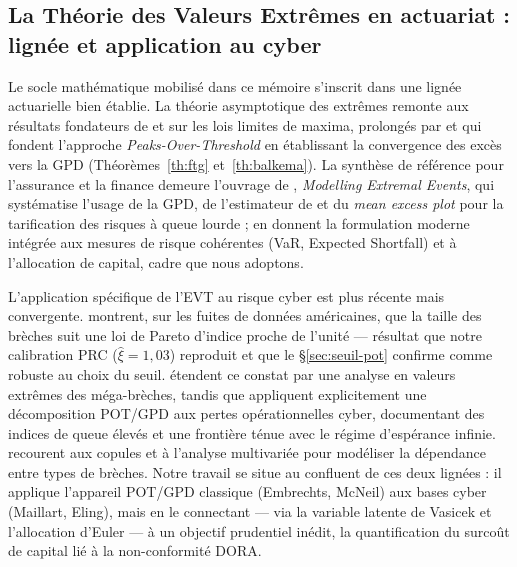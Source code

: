 \documentclass[11pt,a4paper]{article}
\theoremstyle{navystyle}
\theoremstyle{navydef}
\begin{document}
\subsection{La Théorie des Valeurs Extrêmes en actuariat : lignée et application au cyber}

Le socle mathématique mobilisé dans ce mémoire s'inscrit dans une lignée actuarielle bien établie. La théorie asymptotique des extrêmes remonte aux résultats fondateurs de \citet{fishertippett1928} et \citet{gnedenko1943} sur les lois limites de maxima, prolongés par \citet{pickands1975} et \citet{balkemadehaan1974} qui fondent l'approche \emph{Peaks-Over-Threshold} en établissant la convergence des excès vers la GPD (Théorèmes~\ref{th:ftg} et~\ref{th:balkema}). La synthèse de référence pour l'assurance et la finance demeure l'ouvrage de \citet{Embrechts1997}, \emph{Modelling Extremal Events}, qui systématise l'usage de la GPD, de l'estimateur de \citet{Hill1975} et du \emph{mean excess plot} pour la tarification des risques à queue lourde ; \citet{mcneil2015} en donnent la formulation moderne intégrée aux mesures de risque cohérentes (VaR, Expected Shortfall) et à l'allocation de capital, cadre que nous adoptons.

L'application spécifique de l'EVT au risque cyber est plus récente mais convergente. \citet{MaillartSornette2010} montrent, sur les fuites de données américaines, que la taille des brèches suit une loi de Pareto d'indice proche de l'unité --- résultat que notre calibration PRC ($\hat\xi=1{,}03$) reproduit et que le §\ref{sec:seuil-pot} confirme comme robuste au choix du seuil. \citet{wheatley2016} étendent ce constat par une analyse en valeurs extrêmes des méga-brèches, tandis que \citet{elingwirfs2019} appliquent explicitement une décomposition POT/GPD aux pertes opérationnelles cyber, documentant des indices de queue élevés et une frontière ténue avec le régime d'espérance infinie. \citet{elingloperfido2017} recourent aux copules et à l'analyse multivariée pour modéliser la dépendance entre types de brèches. Notre travail se situe au confluent de ces deux lignées : il applique l'appareil POT/GPD classique (Embrechts, McNeil) aux bases cyber (Maillart, Eling), mais en le connectant --- via la variable latente de Vasicek et l'allocation d'Euler --- à un objectif prudentiel inédit, la quantification du surcoût de capital lié à la non-conformité DORA.

\end{document}
